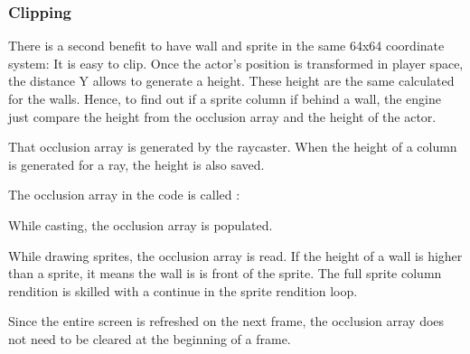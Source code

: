 \subsubsection{Clipping}
There is a second benefit to have wall and sprite in the same 64x64 coordinate system: It is easy to clip. Once the actor's position is transformed in player space, the distance Y allows to generate a height. These height are the same calculated for the walls. Hence, to find out if a sprite column if behind a wall, the engine just compare the height from the occlusion array and the height of the actor.\\
\par
That occlusion array is generated by the raycaster. When the height of a column is generated for a ray, the height is also saved.\\
\par
The occlusion array in the code is called :\\
\par
\begin{minipage}{\textwidth}

\end{minipage}
\par
While casting, the occlusion array is populated.\\
\par
\begin{minipage}{\textwidth}

\end{minipage}
While drawing sprites, the occlusion array is read. If the height of a wall is higher than a sprite, it means the wall is is front of the sprite. The full sprite column rendition is skilled with a continue in the sprite rendition loop.\\
\par
\begin{minipage}{\textwidth}

\end{minipage}
\par
Since the entire screen is refreshed on the next frame, the occlusion array does not need to be cleared at the beginning of a frame.






